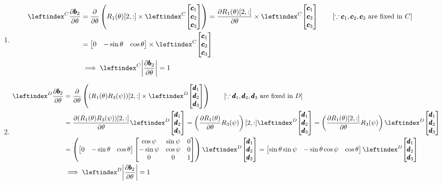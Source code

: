 \begin{enumerate}
\item
\begin{align*}
    \lx{^C}{\frac {\partial \pmb b_2}  {\partial \theta}} &= \frac {\partial}  {\partial \theta} \left( R_1(\theta)[2,:] \times \lx{^C}{\bm{\pmb c_1 \\ \pmb c_2 \\ \pmb c_3}} \right)
    = \frac{\partial R_1(\theta)[2,:]}{\partial \theta} \times \lx{^C}{\bm{\pmb c_1 \\ \pmb c_2 \\ \pmb c_3}}
    \qquad \left[\because \pmb c_1, \pmb c_2, \pmb c_3 \text{ are fixed in } C \right]\\
    &= \bm{0 & -\sin \theta & \cos \theta} \times \lx{^C}{\bm{\pmb c_1 \\ \pmb c_2 \\ \pmb c_3}}\\
    &\implies \lx{^C}{\norm{\frac {\partial \pmb b_2}  {\partial \theta}}} = 1
\end{align*}


 \item
 \begin{align*}
    \lx{^D}{\frac {\partial \pmb b_2}  {\partial \theta}} &= \frac {\partial}  {\partial \theta} \left((R_1(\theta) R_3(\psi))[2,:] \times \lx{^D}{\bm{\pmb d_1 \\ \pmb d_2 \\ \pmb d_3}} \right)
    \qquad \left[\because \pmb d_1, \pmb d_2, \pmb d_3 \text{ are fixed in } D \right]\\
    &= \frac{\partial (R_1(\theta) R_3(\psi))[2,:]}{\partial \theta} \lx{^D}{\bm{\pmb d_1 \\ \pmb d_2 \\ \pmb d_3}}
    = \left(\frac{\partial R_1(\theta) }{\partial \theta} R_3(\psi) \right) [2,:]\lx{^D}{\bm{\pmb d_1 \\ \pmb d_2 \\ \pmb d_3}}
    = \left(\frac{\partial R_1(\theta)[2,:] }{\partial \theta} R_3(\psi) \right)\lx{^D}{\bm{\pmb d_1 \\ \pmb d_2 \\ \pmb d_3}}\\
    &=  \left( \bm{0 & -\sin \theta & \cos \theta}
    \bm{
            \cos \psi & \sin \psi  & 0\\
            -\sin \psi & \cos \psi & 0\\
            0          & 0         & 1
        } \right)\lx{^D}{\bm{\pmb d_1 \\ \pmb d_2 \\ \pmb d_3}}
    = \bm{\sin \theta \sin \psi & -\sin \theta \cos \psi & \cos \theta} \lx{^D}{\bm{\pmb d_1 \\ \pmb d_2 \\ \pmb d_3}}\\
    &\implies  \lx{^D}{\norm{\frac {\partial \pmb b_2}  {\partial \theta}}} = 1
 \end{align*}


\end{enumerate}
